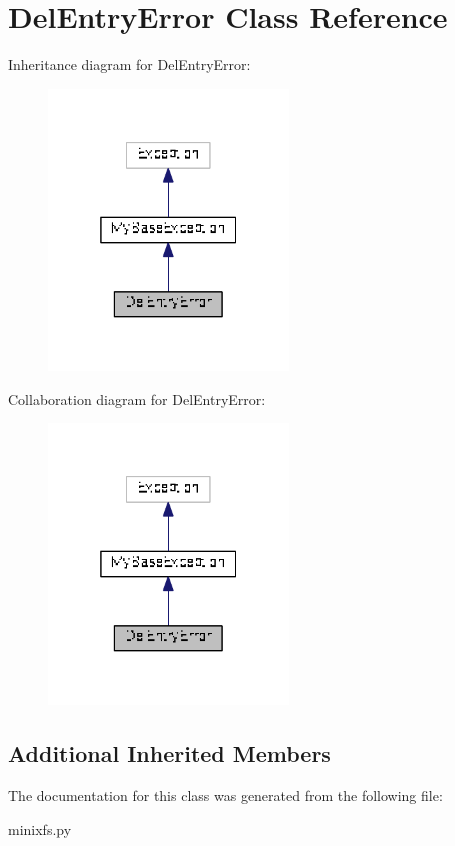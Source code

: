\hypertarget{classminixfs_1_1_del_entry_error}{}\section{Del\+Entry\+Error Class Reference}
\label{classminixfs_1_1_del_entry_error}


Inheritance diagram for Del\+Entry\+Error\+:
\nopagebreak
\begin{figure}[H]
\begin{center}
\leavevmode
\includegraphics[width=181pt]{classminixfs_1_1_del_entry_error__inherit__graph}
\end{center}
\end{figure}


Collaboration diagram for Del\+Entry\+Error\+:
\nopagebreak
\begin{figure}[H]
\begin{center}
\leavevmode
\includegraphics[width=181pt]{classminixfs_1_1_del_entry_error__coll__graph}
\end{center}
\end{figure}
\subsection*{Additional Inherited Members}


The documentation for this class was generated from the following file\+:\begin{DoxyCompactItemize}
\item 
minixfs.\+py\end{DoxyCompactItemize}
